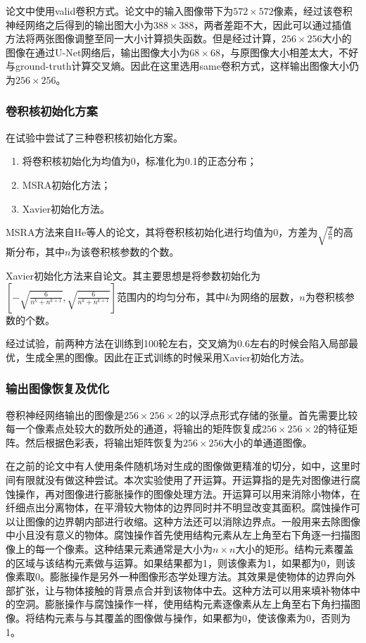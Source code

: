 论文\cite{ronneberger2015u}中使用valid卷积方式。论文中的输入图像带下为$572\times 572$像素，经过该卷积神经网络之后得到的输出图大小为$388\times 388$，两者差距不大，因此可以通过插值方法将两张图像调整至同一大小计算损失函数。但是经过计算，$256\times 256$大小的图像在通过U-Net网络后，输出图像大小为$68\times 68$，与原图像大小相差太大，不好与ground-truth计算交叉熵。因此在这里选用same卷积方式，这样输出图像大小仍为$256\times 256$。

\subsubsection{卷积核初始化方案}
在试验中尝试了三种卷积核初始化方案。

\begin{enumerate}
    \item 将卷积核初始化为均值为0，标准化为0.1的正态分布；
    \item MSRA初始化\cite{he2015delving}方法；
    \item Xavier初始化\cite{glorot2010understanding}方法。
\end{enumerate}

MSRA方法来自He等人的论文\cite{he2015delving}，其将卷积核初始化进行均值为0，方差为$\sqrt{\frac{2}{n}}$的高斯分布，其中$n$为该卷积核参数的个数。

Xavier初始化方法来自论文\cite{glorot2010understanding}。其主要思想是将参数初始化为$[-\sqrt{\frac{6}{n^k+n^{k+1}}},\sqrt{\frac{6}{n^k+n^{k+1}}}]$范围内的均匀分布，其中$k$为网络的层数，$n$为卷积核参数的个数。

经过试验，前两种方法在训练到100轮左右，交叉熵为0.6左右的时候会陷入局部最优，生成全黑的图像。因此在正式训练的时候采用Xavier初始化方法。

\subsubsection{输出图像恢复及优化}
卷积神经网络输出的图像是$256\times 256\times 2$的以浮点形式存储的张量。首先需要比较每一个像素点处较大的数所处的通道，将输出的矩阵恢复成$256\times 256\times 2$的特征矩阵。然后根据色彩表，将输出矩阵恢复为$256\times 256$大小的单通道图像。

在之前的论文中有人使用条件随机场对生成的图像做更精准的切分，如\cite{chandra2016fast}中，这里时间有限就没有做这种尝试。本次实验使用了开运算。开运算指的是先对图像进行腐蚀操作，再对图像进行膨胀操作的图像处理方法。开运算可以用来消除小物体，在纤细点出分离物体，在平滑较大物体的边界同时并不明显改变其面积。腐蚀操作可以让图像的边界朝内部进行收缩。这种方法还可以消除边界点。一般用来去除图像中小且没有意义的物体。腐蚀操作首先使用结构元素从左上角至右下角逐一扫描图像上的每一个像素。这种结果元素通常是大小为$n\times n$大小的矩形。结构元素覆盖的区域与该结构元素做与运算。如果结果都为1，则该像素为1，如果都为0，则该像素取0。膨胀操作是另外一种图像形态学处理方法。其效果是使物体的边界向外部扩张，让与物体接触的背景点合并到该物体中去。这种方法可以用来填补物体中的空洞。膨胀操作与腐蚀操作一样，使用结构元素逐像素从左上角至右下角扫描图像。将结构元素与与其覆盖的图像做与操作，如果都为0，使该像素为0，否则为1。

